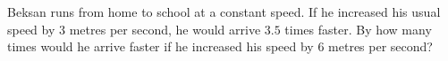 Beksan runs from home to school at a constant speed. If he increased his usual speed by $3$ metres per second, he would arrive $3.5$ times faster. By how many times would he arrive faster if he increased his speed by $6$ metres per second?
